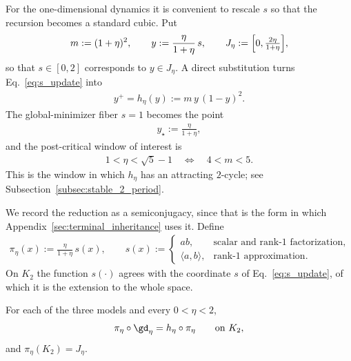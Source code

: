 \documentclass{article}
\begin{document}
For the one-dimensional dynamics it is convenient to rescale $s$ so that the
recursion becomes a standard cubic. Put
\begin{align}
    m:=(1+\eta)^2,
    \qquad
    y:=\frac{\eta}{1+\eta}\,s,
    \qquad
    J_\eta:=\Bigl[0,\tfrac{2\eta}{1+\eta}\Bigr],
    \label{eq:y_definition}
\end{align}
so that $s\in[0,2]$ corresponds to $y\in J_\eta$. A direct substitution turns
Eq.~\eqref{eq:s_update} into
\begin{align}
    y^+ = h_\eta(y) := m\,y\,(1-y)^2 .
    \label{eq:h_eta}
\end{align}
The global-minimizer fiber $s=1$ becomes the point
\begin{align}
    y_\star:=\frac{\eta}{1+\eta},
\end{align}
and the post-critical window of interest is
\begin{align}
    1<\eta<\sqrt5-1
    \quad\Longleftrightarrow\quad
    4<m<5 .
\end{align}
This is the window in which $h_\eta$ has an attracting $2$-cycle; see
Subsection~\ref{subsec:stable_2_period}.

We record the reduction as a semiconjugacy, since that is the form in which
Appendix~\ref{sec:terminal_inheritance} uses it. Define
\begin{align}
    \pi_\eta(x):=\frac{\eta}{1+\eta}\,s(x),
    \qquad
    s(x):=
    \begin{cases}
        ab, & \text{scalar and rank-1 factorization},\\
        \langle a,b\rangle, & \text{rank-1 approximation}.
    \end{cases}
    \label{eq:pi_eta}
\end{align}
On $K_2$ the function $s(\cdot)$ agrees with the coordinate $s$ of
Eq.~\eqref{eq:s_update}, of which it is the extension to the whole space.

\begin{proposition}
\label{prop:terminal_cubic_semiconjugacy}
For each of the three models and every $0<\eta<2$,
\begin{align}
    \pi_\eta\circ\gd_\eta = h_\eta\circ\pi_\eta
    \qquad\text{on } K_2,
\end{align}
and $\pi_\eta(K_2)=J_\eta$.
\end{proposition}
\end{document}
